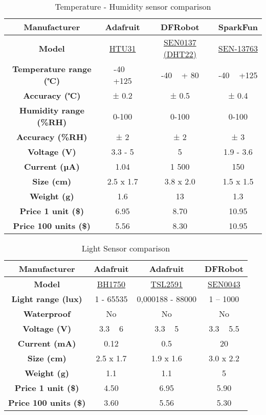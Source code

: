 \begin{table}[!h]
    \centering
    \scriptsize
    \begin{tabular}{c c c c}
        \hline
        \textbf{Manufacturer} & Adafruit & DFRobot & SparkFun\\
        \hline
        \textbf{Model} & \href{https://www.adafruit.com/product/4832}{HTU31} & \href{https://www.dfrobot.com/product-1102.html}{SEN0137 (DHT22)} & \href{https://www.sparkfun.com/products/13763#reviews}{SEN-13763}\\
        \textbf{Temperature range (℃)} & -40 ~ +125 & -40 ~ + 80 & -40 ~ +125\\
        \textbf{Accuracy (℃)} & ± 0.2 & ± 0.5 & ± 0.4\\
        \textbf{Humidity range (\%RH)} & 0-100 & 0-100 & 0-100\\
        \textbf{Accuracy (\%RH)} & ± 2 & ± 2 & ± 3\\
        \textbf{Voltage (V)} & 3.3 - 5 & 5 & 1.9 - 3.6\\
        \textbf{Current (µA)} & 1.04 & 1 500 & 150\\
        \textbf{Size (cm)} & 2.5 x 1.7 & 3.8 x 2.0 & 1.5 x 1.5\\
        \textbf{Weight (g)} & 1.6 & 13 & 1.3\\
        \textbf{Price 1 unit (\$)} & 6.95 & 8.70 & 10.95\\
        \textbf{Price 100 units (\$)} & 5.56 & 8.30 & 10.95\\
        \hline
        \end{tabular}
    \caption{Temperature - Humidity sensor comparison}
    \label{tab:temp_hum_sensor_comparison}
\end{table}

\begin{table}[!h]
    \centering
    \begin{tabular}{c c c c}
        \hline
        \textbf{Manufacturer} & Adafruit & Adafruit & DFRobot\\
        \hline
        \textbf{Model} & \href{https://www.adafruit.com/product/4681}{BH1750} & \href{https://learn.adafruit.com/tsl2561}{TSL2591} & \href{https://www.dfrobot.com/product-274.html}{SEN0043}\\
        \textbf{Light range (lux)} & 1 - 65535 & 0,000188 - 88000 & 1 – 1000\\
        \textbf{Waterproof} & No & No & No\\
        \textbf{Voltage (V)} & 3.3 ~ 6 & 3.3 ~ 5 & 3.3 ~ 5.5\\
        \textbf{Current (mA)} & 0.12 & 0.5 & 20\\
        \textbf{Size (cm)} & 2.5 x 1.7 & 1.9 x 1.6 & 3.0 x 2.2\\
        \textbf{Weight (g)} & 1.1 & 1.1 & 5\\
        \textbf{Price 1 unit (\$)} & 4.50 & 6.95 & 5.90\\
        \textbf{Price 100 units (\$)} & 3.60 & 5.56 & 5.30\\
        \hline
        \end{tabular}
    \caption{Light Sensor comparison}
    \label{tab:light_sensor_comparison}
\end{table}

